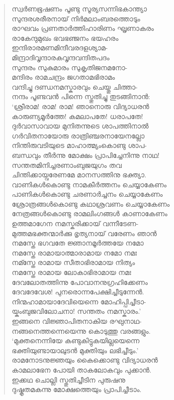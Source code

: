 \begin{verse}
സ്വര്‍ണഭൂഷണം പൂണ്ടു സൂര്യസന്നിഭകാന്ത്യാ\\
സുന്ദരശരീരനായ് നിര്‍മലാംബരത്തൊടും\\
രാഘവം പ്രണതാര്‍ത്തിഹാരിണം ഘൃണാകരം\\
രാകേന്ദുമുഖം ഭവഭഞ്ജനം ഭയഹരം\\
ഇന്ദിരാരമണമിന്ദീവരദളശ്യാമ-\\
മിന്ദ്രാദിവൃന്ദാരകവൃന്ദവന്ദിതപദം\\
സുന്ദരം സുകുമാരം സുകൃതിജനമനോ-\\
മന്ദിരം രാമചന്ദ്രം ജഗതാമഭിരാമം\\
വന്ദിച്ചു ദണ്ഡനമസ്കാരവും ചെയ്തു ചിത്താ-\\
നന്ദം പൂണ്ടവന്‍ പിന്നെ സ്തുതിച്ചു തുടങ്ങിനാന്‍:\\
‘ശ്രീരാമ! രാമ! രാമ! ഞാനൊരു വിദ്യാധരന്‍\\
കാരുണ്യമൂര്‍ത്തേ! കമലാപതേ! ധരാപതേ!\\
ദുര്‍വാസാവായ മുനിതന്നുടെ ശാപത്തിനാല്‍\\
ഗര്‍വിതനായോരു രാത്രിഞ്ചരനായേനല്ലോ\\
നിന്തിരുവടിയുടെ മാഹാത്മ്യംകൊണ്ടു ശാപ-\\
ബന്ധവും തീര്‍ന്നു മോക്ഷം പ്രാപിച്ചേനിന്നു നാഥ!\\
സന്തതമിനിച്ചരണാംബുജയുഗം തവ\\
ചിന്തിക്കായ്വരേണമേ മാനസത്തിനു ഭക്ത്യാ.\\
വാണികള്‍കൊണ്ടു നാമകീര്‍ത്തനം ചെയ്യാകേണം\\
പാണികള്‍കൊണ്ടു ചരണാര്‍ച്ചനം ചെയ്യാകേണം\\
ശ്രോത്രങ്ങള്‍കൊണ്ടു കഥാശ്രവണം ചെയ്യാകേണം\\
നേത്രങ്ങള്‍കൊണ്ടു രാമലിംഗങ്ങള്‍ കാണാകേണം\\
ഉത്തമാഗേന നമസ്കരിക്കായ് വന്നീടേണ-\\
മുത്തമഭക്തന്മാര്‍ക്കു ഭൃത്യനായ് വരേണം ഞാന്‍\\
നമസ്തേ ഭഗവതേ ജ്ഞാനമൂര്‍ത്തയേ നമോ\\
നമസ്തേ രാമായാത്മാരാമായ നമോ നമഃ\\
നമ്സ്തേ രാമായ സീതാഭിരാമായ നിത്യം\\
നമസ്തേ രാമായ ലോകാഭിരാമായ നമഃ\\
ദേവലോതത്തിന്നു പോവാനനുഗ്രഹിക്കേണം\\
ദേവദേവേശ! പുനരൊന്നപേക്ഷിച്ചീടുന്നേന്‍.\\
നിന്മഹാമായാദേവിയെന്നെ മോഹിപ്പിച്ചീടാ-\\
യ്കംബുജവിലോചനാ! സന്തതം നമസ്കാരം.’\\
ഇങ്ങനെ വിജ്ഞാപിതനാകിയ രഘുനാഥ-\\
നങ്ങനെത്തന്നെയെന്നു കൊടുത്തു വരങ്ങളും.\\
‘മുക്തനെന്നിയേ കണ്ടുകിട്ടുകയില്ലയെന്നെ\\
ഭക്തിയുണ്ടായാലുടന്‍ മുക്തിയും ലഭിച്ചീടും.’\\
രാമനോടനുജ്ഞയും കൈക്കൊണ്ടു വിദ്യാധരന്‍\\
കാമലാഭേന പോയി താകലോകവും പുക്കാന്‍.\\
ഇക്കഥ ചൊല്ലി സ്തുതിച്ചീടിന പുരുഷനു\\
ദുഷ്കൃതമകന്നു മോക്ഷത്തെയും പ്രാപിച്ചീടാം.
\end{verse}

